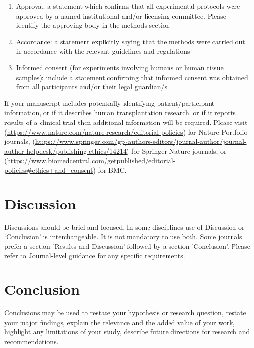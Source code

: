 \documentclass[pdflatex,sn-mathphys-num]{sn-jnl}%
\theoremstyle{thmstyleone}%
\theoremstyle{thmstyletwo}%
\theoremstyle{thmstylethree}%
\begin{document}
\begin{enumerate}[1.]
\item Approval: a statement which confirms that all experimental protocols were approved by a named institutional and/or licensing committee. Please identify the approving body in the methods section

\item Accordance: a statement explicitly saying that the methods were carried out in accordance with the relevant guidelines and regulations

\item Informed consent (for experiments involving humans or human tissue samples): include a statement confirming that informed consent was obtained from all participants and/or their legal guardian/s
\end{enumerate}

If your manuscript includes potentially identifying patient/participant information, or if it describes human transplantation research, or if it reports results of a clinical trial then  additional information will be required. Please visit (\url{https://www.nature.com/nature-research/editorial-policies}) for Nature Portfolio journals, (\url{https://www.springer.com/gp/authors-editors/journal-author/journal-author-helpdesk/publishing-ethics/14214}) for Springer Nature journals, or (\url{https://www.biomedcentral.com/getpublished/editorial-policies\#ethics+and+consent}) for BMC.

\fi

\section{Discussion}\label{sec12}

Discussions should be brief and focused. In some disciplines use of Discussion or `Conclusion' is interchangeable. It is not mandatory to use both. Some journals prefer a section `Results and Discussion' followed by a section `Conclusion'. Please refer to Journal-level guidance for any specific requirements. 

\section{Conclusion}\label{sec13}

Conclusions may be used to restate your hypothesis or research question, restate your major findings, explain the relevance and the added value of your work, highlight any limitations of your study, describe future directions for research and recommendations. 
\end{document}
